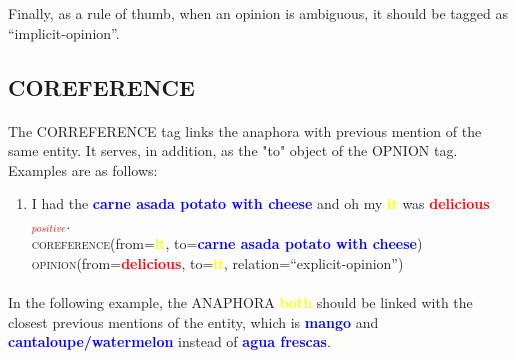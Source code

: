 \documentclass{article}
\begin{document}
Finally, as a rule of thumb, when an opinion is ambiguous, it should be tagged as ``implicit-opinion''.

\subsection{COREFERENCE}
\paragraph{}
The CORREFERENCE tag links the anaphora with previous mention of the same entity. It serves, in addition, as the "to" object of the OPNION tag. Examples are as follows:

\begin{enumerate}[resume]
	\item I had the \textbf{\textcolor{blue}{carne asada potato with cheese}} and oh my \textbf{\textcolor{yellow}{it}} was \textbf{\textcolor{red}{delicious$_{positive}$}}.\\
	\textsc{coreference}(from=\textbf{\textcolor{yellow}{it}}, to=\textbf{\textcolor{blue}{carne asada potato with cheese}})\\
		\textsc{opinion}(from=\textbf{\textcolor{red}{delicious}}, to=\textbf{\textcolor{yellow}{it}}, relation=``explicit-opinion'')
\end{enumerate}

\paragraph{}
In the following example, the ANAPHORA \textbf{\textcolor{yellow}{both}} should be linked with the closest previous mentions of the entity, which is \textbf{\textcolor{blue}{mango}} and \textbf{\textcolor{blue}{cantaloupe/watermelon}} instead of \textbf{\textcolor{blue}{agua frescas}}.
\end{document}
